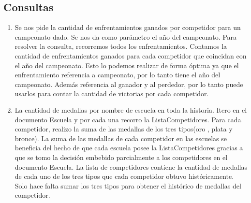 \subsection{Consultas}
\begin{enumerate}
\item Se nos pide la cantidad de enfrentamientos ganados por competidor para un campeonato dado. Se nos da como parámetro
el año del campeonato. Para resolver la consulta, recorremos todos los enfrentamientos. Contamos la cantidad de
enfrentamientos ganados para cada competidor que coincidan con el año del campeonato. Esto lo podemos realizar de forma óptima
ya que el enfrentamiento referencia a campeonato, por lo tanto tiene el año del campeonato. Además referencia al ganador y al
perdedor, por lo tanto puede usarlos para contar la cantidad de victorias por cada competidor.

\item La cantidad de medallas por nombre de escuela en toda la historia. Itero en el documento Escuela y por cada una
recorro la ListaCompetidores. Para cada competidor, realizo la suma de las medallas de los tres tipos(oro
, plata y bronce). La suma de las medallas de cada competidor en las escuelas se beneficia del hecho de que cada escuela
posee la ListaCompetidores gracias a que se tomo la decisión embebido parcialmente a los competidores en el documento
Escuela. La lista de competidores contiene la cantidad de medallas de cada uno de los tres tipos que cada competidor obtuvo
históricamente. Solo hace falta sumar los tres tipos para obtener el histórico de medallas del competidor.


\end{enumerate}
